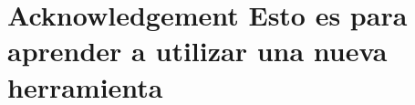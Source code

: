 \chapter*{Acknowledgement Esto es para aprender a utilizar una nueva herramienta}

\Blindtext

\undersign